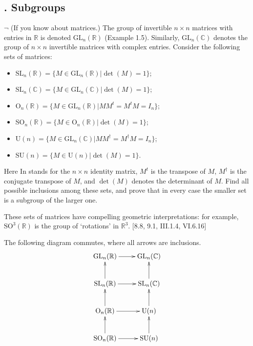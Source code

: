 \documentclass[12pt,letterpaper,boxed]{hmcpset}
\newcommand{\GL}{\mathrm{GL}}
\newcommand{\SL}{\mathrm{SL}}
\newcommand{\R}{\mathbb{R}}
\newcommand{\C}{\mathbb{C}}
\begin{document}
\subsection{. Subgroups} 
\hypertarget{Exercise II.6.1}{}
\begin{problem}[6.1]
$\neg$ (If you know about matrices.) The group of invertible $n \times n$ matrices with entries in $\R$ is denoted $\GL_n(\R)$ (Example 1.5). Similarly, $\GL_n(\C)$ denotes the group of $n \times n$ invertible matrices with complex entries. Consider the following sets of
matrices:
\begin{itemize}
	\item $\SL_n(\R) = \{M \in \GL_n(\R) | \det(M) = 1\}$;
	\item $ \SL_n(\C) = \{M \in \GL_n(\C) | \det(M) = 1\}$;
	\item $\mathrm{O}_n(\R) = \{M \in \GL_n(\R) |MM^t = M^tM = I_n\}$;
	\item $\mathrm{SO}_n(\R) = \{M \in \mathrm{O}_n(\R) | \det (M) = 1\}$;
	\item  $\mathrm{U}(n) = \{M \in \GL_n(\C) |MM^\dag = M^\dag M = I_n\}$;
	\item  $\mathrm{SU}(n) = \{M \in \mathrm{U}(n) | \det(M) = 1\}$.
\end{itemize}

Here In stands for the $n \times n$ identity matrix, $M^t$ is the transpose of $M$, $M^\dag$ is the
conjugate transpose of $M$, and $\det(M)$ denotes the determinant of $M$. Find all possible inclusions among these sets, and prove that in every case the smaller set is a subgroup of the larger one.

These sets of matrices have compelling geometric interpretations: for example, $\mathrm{SO}^3(\R)$ is the group of ‘rotations’ in $\R^3$. [8.8, 9.1, III.1.4, VI.6.16]
\end{problem}
\begin{solution}
The following diagram commutes, where all arrows are inclusions.
\[\xymatrix{
	\GL_n(\R)\ar[r] & \GL_n(\C)\\
	\SL_n(\R)\ar[r]\ar[u] & \SL_n(\C)\ar[u]\\
	\mathrm{O}_n(\R)\ar[r]\ar[u] & \mathrm{U}(n)\ar[u]\\
	\mathrm{SO}_n(\R)\ar[r]\ar[u] & \mathrm{SU}(n) \ar[u]
}\]
\end{solution}
\end{document}
